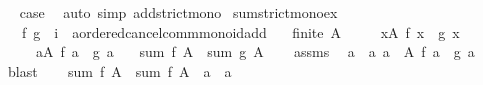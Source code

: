 \begin{isabellebody}
\ \isamarkupfalse%
\ {\isacharquery}{\kern0pt}case\ \isamarkupfalse%
\ {\isacharparenleft}{\kern0pt}auto\ simp{\isacharcolon}{\kern0pt}\ add{\isacharunderscore}{\kern0pt}strict{\isacharunderscore}{\kern0pt}mono{\isacharparenright}{\kern0pt}\isanewline
{}\isamarkupfalse%
%
\endisatagproof
{\isafoldproof}%
%
\isadelimproof
\isanewline
%
\endisadelimproof
\isanewline
{}\isamarkupfalse%
\ sum{\isacharunderscore}{\kern0pt}strict{\isacharunderscore}{\kern0pt}mono{\isacharunderscore}{\kern0pt}ex{}{\isacharcolon}{\kern0pt}\isanewline
\ \ \ f\ g\ {\isacharcolon}{\kern0pt}{\isacharcolon}{\kern0pt}\ {\isachardoublequoteopen}{\isacharprime}{\kern0pt}i\ {\isasymRightarrow}\ {\isacharprime}{\kern0pt}a{\isacharcolon}{\kern0pt}{\isacharcolon}{\kern0pt}ordered{\isacharunderscore}{\kern0pt}cancel{\isacharunderscore}{\kern0pt}comm{\isacharunderscore}{\kern0pt}monoid{\isacharunderscore}{\kern0pt}add{\isachardoublequoteclose}\isanewline
\ \ \ {\isachardoublequoteopen}finite\ A{\isachardoublequoteclose}\isanewline
\ \ \ \ \ {\isachardoublequoteopen}{\isasymforall}x{\isasymin}A{\isachardot}{\kern0pt}\ f\ x\ {\isasymle}\ g\ x{\isachardoublequoteclose}\isanewline
\ \ \ \ \ {\isachardoublequoteopen}{\isasymexists}a{\isasymin}A{\isachardot}{\kern0pt}\ f\ a\ {\isacharless}{\kern0pt}\ g\ a{\isachardoublequoteclose}\isanewline
\ \ \ {\isachardoublequoteopen}sum\ f\ A\ {\isacharless}{\kern0pt}\ sum\ g\ A{\isachardoublequoteclose}\isanewline
%
\isadelimproof
%
\endisadelimproof
%
\isatagproof
{}\isamarkupfalse%
{\isacharminus}{\kern0pt}\isanewline
\ \ \isamarkupfalse%
\ assms{\isacharparenleft}{\kern0pt}{}{\isacharparenright}{\kern0pt}\ \isamarkupfalse%
\ a\ \ a{\isacharcolon}{\kern0pt}\ {\isachardoublequoteopen}a\ {\isasymin}\ A{\isachardoublequoteclose}\ {\isachardoublequoteopen}f\ a\ {\isacharless}{\kern0pt}\ g\ a{\isachardoublequoteclose}\ \isamarkupfalse%
\ blast\isanewline
\ \ \isamarkupfalse%
\ {\isachardoublequoteopen}sum\ f\ A\ {\isacharequal}{\kern0pt}\ sum\ f\ {\isacharparenleft}{\kern0pt}{\isacharparenleft}{\kern0pt}A\ {\isacharminus}{\kern0pt}\ {\isacharbraceleft}{\kern0pt}a{\isacharbraceright}{\kern0pt}{\isacharparenright}{\kern0pt}\ {\isasymunion}\ {\isacharbraceleft}{\kern0pt}a{\isacharbraceright}{\kern0pt}{\isacharparenright}{\kern0pt}{\isachardoublequoteclose}\isanewline
\ \ \ \ \isamarkupfalse%

\end{isabellebody}
